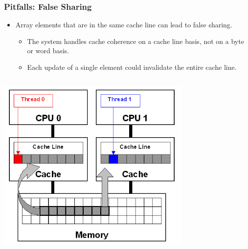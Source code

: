 \documentclass[10pt,t]{beamer}
\begin{document}
\begin{frame}[fragile]
  \frametitle{Pitfalls: False Sharing}
  \begin{itemize}
    \item Array elements that are in the same cache line can lead to false sharing.
    \begin{itemize}
      \item The system handles cache coherence on a cache line basis, not on a byte or word basis.
      \item Each update of a single element could invalidate the entire cache line.
    \end{itemize}
  \end{itemize}
  \begin{columns}
    \begin{center}
      \includegraphics[width=0.75\textwidth]{./falsesharing}
    \end{center}
    \begin{exampleblock}{}
      
    \end{exampleblock}
  \end{columns}
\end{frame}
\end{document}
